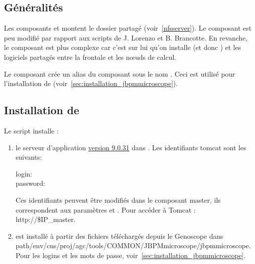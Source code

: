 \subsection{Généralités}

Les composants  et  montent le dossier partagé  (voir~\autoref{nfsserver}).
Le composant  est peu modifié par rapport aux scripts de J. Lorenzo et B. Brancotte.
En revanche, le composant  est plus complexe car
c'est sur lui qu'on installe  (et donc )
et les logiciels partagés entre la frontale et les nœuds de calcul.

Le composant  crée un alias du composant  sous le nom .
Ceci est utilisé pour l'installation de  (voir~\autoref{sec:installation_jbpmmicroscope}).

\subsection{Installation de }

Le script installe :
\begin{enumerate}
    \item le serveur d'application \href{http://mirrors.ircam.fr/pub/apache/tomcat/tomcat-9/v9.0.31/bin/apache-tomcat-9.0.31.tar.gz}{ version 9.0.31} dans .
    Les identifiants tomcat sont les suivants:
    \begin{description}
        \item[login:] 
        \item[password:] 
    \end{description}
    Ces identifiants peuvent être modifiés dans le composant master, ils correspondent aux paramètres  et .
    Pour accéder à Tomcat : http://\$IP\_master.

    \item {} est installé à partir des fichiers téléchargés depuis le Genoscope
    dans path{/env/cns/proj/agc/tools/COMMON/JBPMmicroscope/jbpmmicroscope}.
    Pour les logins et les mots de passe, voir~\autoref{sec:installation_jbpmmicroscope}.
\end{enumerate}

